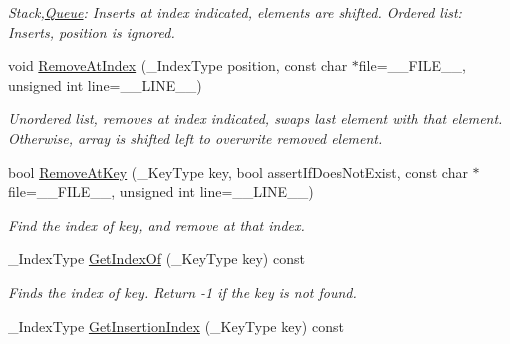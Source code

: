 \begin{DoxyCompactItemize}
\begin{DoxyCompactList}\small\item\em Stack,\hyperlink{class_data_structures_1_1_queue}{Queue}\-: Inserts at index indicated, elements are shifted. Ordered list\-: Inserts, position is ignored. \end{DoxyCompactList}\item 
void \hyperlink{class_data_structures_1_1_multilist_a33dd81344fc1e3ddada972637cfe27c3}{Remove\-At\-Index} (\-\_\-\-Index\-Type position, const char $\ast$file=\-\_\-\-\_\-\-F\-I\-L\-E\-\_\-\-\_\-, unsigned int line=\-\_\-\-\_\-\-L\-I\-N\-E\-\_\-\-\_\-)
\begin{DoxyCompactList}\small\item\em Unordered list, removes at index indicated, swaps last element with that element. Otherwise, array is shifted left to overwrite removed element. \end{DoxyCompactList}\item 
\hypertarget{class_data_structures_1_1_multilist_aa3c83303215bacfc4510640efc062d39}{bool \hyperlink{class_data_structures_1_1_multilist_aa3c83303215bacfc4510640efc062d39}{Remove\-At\-Key} (\-\_\-\-Key\-Type key, bool assert\-If\-Does\-Not\-Exist, const char $\ast$file=\-\_\-\-\_\-\-F\-I\-L\-E\-\_\-\-\_\-, unsigned int line=\-\_\-\-\_\-\-L\-I\-N\-E\-\_\-\-\_\-)}\label{class_data_structures_1_1_multilist_aa3c83303215bacfc4510640efc062d39}

\begin{DoxyCompactList}\small\item\em Find the index of {\itshape key}, and remove at that index. \end{DoxyCompactList}\item 
\hypertarget{class_data_structures_1_1_multilist_a84be6225dbac07350dee2ff8a8210e17}{\-\_\-\-Index\-Type \hyperlink{class_data_structures_1_1_multilist_a84be6225dbac07350dee2ff8a8210e17}{Get\-Index\-Of} (\-\_\-\-Key\-Type key) const }\label{class_data_structures_1_1_multilist_a84be6225dbac07350dee2ff8a8210e17}

\begin{DoxyCompactList}\small\item\em Finds the index of {\itshape key}. Return -\/1 if the key is not found. \end{DoxyCompactList}\item 
\hypertarget{class_data_structures_1_1_multilist_af0e4d9aacbd1b22979a50dcd91522735}{\-\_\-\-Index\-Type \hyperlink{class_data_structures_1_1_multilist_af0e4d9aacbd1b22979a50dcd91522735}{Get\-Insertion\-Index} (\-\_\-\-Key\-Type key) const }\label{class_data_structures_1_1_multilist_af0e4d9aacbd1b22979a50dcd91522735}


\end{DoxyCompactItemize}
